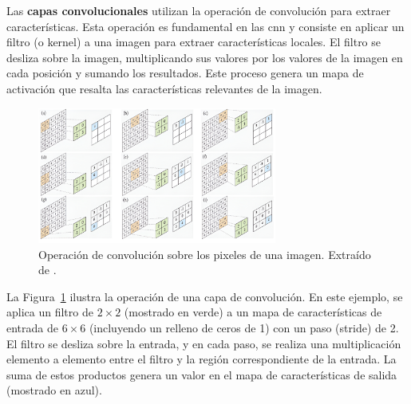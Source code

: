 \documentclass[11pt,spanish,listoffigures,listoftables]{tfgetsinf}
\begin{document}
Las \textbf{capas convolucionales} utilizan la operación de convolución para extraer características. Esta operación es fundamental en las \gls{cnn} y consiste en aplicar un filtro (o kernel) a una imagen para extraer características locales. El filtro se desliza sobre la imagen, multiplicando sus valores por los valores de la imagen en cada posición y sumando los resultados. Este proceso genera un mapa de activación que resalta las características relevantes de la imagen.

\begin{figure}[H]
   \centering
   \includegraphics[width=0.7\textwidth]{images/estado_del_arte/operacion_convolucion.png}
   \caption[Operación de convolución sobre los pixeles de una imagen]{Operación de convolución sobre los pixeles de una imagen. Extraído de \cite[fig. 2.5, p. ~48]{khan2018guide}.}
   \label{fig:operacion_convolucion}
\end{figure}

La Figura~\ref{fig:operacion_convolucion} ilustra la operación de una capa de convolución. En este ejemplo, se aplica un filtro de $2 \times 2$ (mostrado en verde) a un mapa de características de entrada de $6 \times 6$ (incluyendo un relleno de ceros de 1) con un paso (stride) de 2. El filtro se desliza sobre la entrada, y en cada paso, se realiza una multiplicación elemento a elemento entre el filtro y la región correspondiente de la entrada. La suma de estos productos genera un valor en el mapa de características de salida (mostrado en azul).
\end{document}
